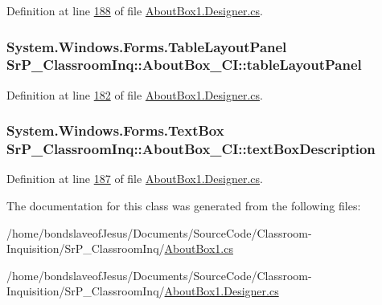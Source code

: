 \-Definition at line \hyperlink{_about_box1_8_designer_8cs_source_l00188}{188} of file \hyperlink{_about_box1_8_designer_8cs_source}{\-About\-Box1.\-Designer.\-cs}.

\hypertarget{class_sr_p___classroom_inq_1_1_about_box___c_i_ad10dbcf552f02d9075d3512e37346602}{
\subsubsection[{table\-Layout\-Panel}]{\setlength{\rightskip}{0pt plus 5cm}\-System.\-Windows.\-Forms.\-Table\-Layout\-Panel {\bf \-Sr\-P\-\_\-\-Classroom\-Inq\-::\-About\-Box\-\_\-\-C\-I\-::table\-Layout\-Panel}}}
\label{class_sr_p___classroom_inq_1_1_about_box___c_i_ad10dbcf552f02d9075d3512e37346602}


\-Definition at line \hyperlink{_about_box1_8_designer_8cs_source_l00182}{182} of file \hyperlink{_about_box1_8_designer_8cs_source}{\-About\-Box1.\-Designer.\-cs}.

\hypertarget{class_sr_p___classroom_inq_1_1_about_box___c_i_a3dbeb289a884177d325e5d3145c29427}{
\subsubsection[{text\-Box\-Description}]{\setlength{\rightskip}{0pt plus 5cm}\-System.\-Windows.\-Forms.\-Text\-Box {\bf \-Sr\-P\-\_\-\-Classroom\-Inq\-::\-About\-Box\-\_\-\-C\-I\-::text\-Box\-Description}}}
\label{class_sr_p___classroom_inq_1_1_about_box___c_i_a3dbeb289a884177d325e5d3145c29427}


\-Definition at line \hyperlink{_about_box1_8_designer_8cs_source_l00187}{187} of file \hyperlink{_about_box1_8_designer_8cs_source}{\-About\-Box1.\-Designer.\-cs}.



\-The documentation for this class was generated from the following files\-:\begin{DoxyCompactItemize}
\item 
/home/bondslaveof\-Jesus/\-Documents/\-Source\-Code/\-Classroom-\/\-Inquisition/\-Sr\-P\-\_\-\-Classroom\-Inq/\hyperlink{_about_box1_8cs}{\-About\-Box1.\-cs}\item 
/home/bondslaveof\-Jesus/\-Documents/\-Source\-Code/\-Classroom-\/\-Inquisition/\-Sr\-P\-\_\-\-Classroom\-Inq/\hyperlink{_about_box1_8_designer_8cs}{\-About\-Box1.\-Designer.\-cs}\end{DoxyCompactItemize}
